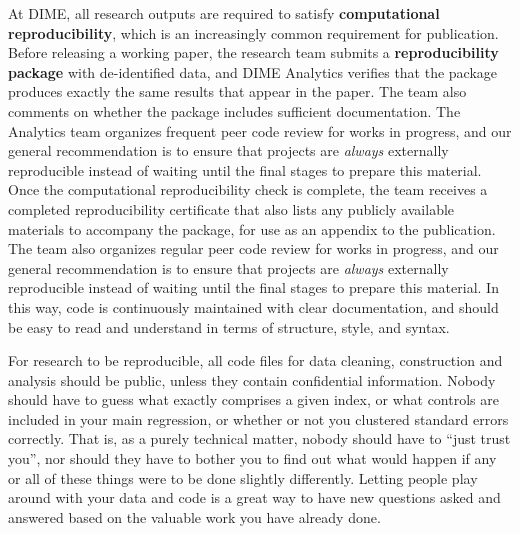 At DIME, all research outputs are required to satisfy \textbf{computational reproducibility},
which is an increasingly common requirement for publication.
Before releasing a working paper,
the research team submits a \textbf{reproducibility package} with de-identified data,
and DIME Analytics verifies that the package produces
exactly the same results that appear in the paper.
The team also comments on whether the package includes sufficient documentation.
The Analytics team organizes frequent peer code review for works in progress,
and our general recommendation is to ensure that projects
are \textit{always} externally reproducible
instead of waiting until the final stages to prepare this material.
Once the computational reproducibility check is complete,
the team receives a completed reproducibility certificate
that also lists any publicly available materials to accompany the package,
for use as an appendix to the publication.
The team also organizes regular peer code review for works in progress,
and our general recommendation is to ensure that projects
are \textit{always} externally reproducible
instead of waiting until the final stages to prepare this material.
In this way, code is continuously maintained with clear documentation,
and should be easy to read and understand in terms of structure, style, and syntax.

For research to be reproducible,
all code files for data cleaning, construction and analysis
should be public, unless they contain confidential information.
Nobody should have to guess what exactly comprises a given index,
or what controls are included in your main regression,
or whether or not you clustered standard errors correctly.
That is, as a purely technical matter, nobody should have to ``just trust you'',
nor should they have to bother you to find out what would happen
if any or all of these things were to be done slightly differently.
Letting people play around with your data and code
is a great way to have new questions asked and answered
based on the valuable work you have already done.

